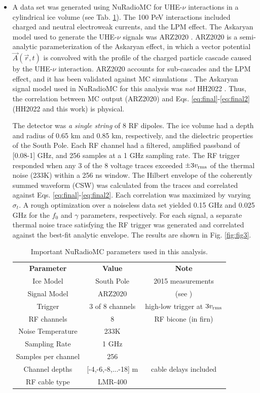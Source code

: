 \documentclass[amsmath,amssymb,aps,prd,10pt,twocolumn,showkeys]{revtex4}
\begin{document}
\begin{itemize}
\item A data set was generated using NuRadioMC for UHE-$\nu$ interactions in a cylindrical ice volume (see Tab. \ref{tab:1}).  The 100 PeV interactions included charged and neutral electroweak currents, and the LPM effect.  The Askaryan model used to generate the UHE-$\nu$ signals was ARZ2020 \cite{PhysRevD.101.083005}.  ARZ2020 is a semi-analytic parameterization of the Askaryan effect, in which a vector potential $\vec{A}(\vec{r},t)$ is convolved with the profile of the charged particle cascade caused by the UHE-$\nu$ interaction.  ARZ2020 accounts for sub-cascades and the LPM effect, and it has been validated against MC simulations \cite{zhs,10.1103/physrevd.84.103003}.  The Askaryan signal model used in NuRadioMC for this analysis was \textit{not} HH2022 \cite{PhysRevD.105.123019}.  Thus, the correlation between MC output (ARZ2020) and Eqs. \ref{eq:final}-\ref{eq:final2} (HH2022 and this work) is physical.

The detector was \textit{a single string} of 8 RF dipoles.  The ice volume had a depth and radius of 0.65 km and 0.85 km, respectively, and the dielectric properties of the South Pole.  Each RF channel had a filtered, amplified passband of [0.08-1] GHz, and 256 samples at a 1 GHz sampling rate.  The RF trigger responded when any 3 of the 8 voltage traces exceeded $\pm 3 v_{\rm rms}$ of the thermal noise (233K) within a 256 ns window.  The Hilbert envelope of the coherently summed waveform (CSW) was calculated from the traces and correlated against Eqs. \ref{eq:final}-\ref{eq:final2}.  Each correlation was maximized by varying $\sigma_t$.  A rough optimization over a noiseless data set yielded 0.15 GHz and 0.025 GHz for the $f_0$ and $\gamma$ parameters, respectively.  For each signal, a separate thermal noise trace satisfying the RF trigger was generated and correlated against the best-fit analytic envelope.  The results are shown in Fig. \ref{fig:fig3}.

\begin{table}
\centering
\begin{tabular}{| c | c | c |}
\hline
\textbf{Parameter} & \textbf{Value} & \textbf{Note} \\
Ice Model & South Pole & 2015 measurements \\
Signal Model & ARZ2020 & (see \cite{PhysRevD.101.083005}) \\
Trigger & 3 of 8 channels & high-low trigger at $3v_{\rm rms}$ \\
RF channels & 8 & RF bicone (in firn) \\
Noise Temperature & 233K &  \\
Sampling Rate & 1 GHz &  \\
Samples per channel & 256 &  \\
Channel depths & [-4,-6,-8,...-18] m & cable delays included \\
RF cable type & LMR-400 & \\
\hline
\end{tabular}
\caption{\label{tab:1} Important NuRadioMC parameters used in this analysis.}
\end{table}


\end{itemize}
\end{document}
